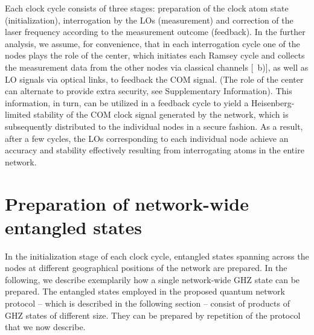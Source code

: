 Each clock cycle consists of three stages: preparation of the clock atom state
(initialization), interrogation by the LOs (measurement) and correction of the
laser frequency according to the measurement outcome (feedback).
In the further analysis, we assume, for convenience, that in each interrogation
cycle one of the nodes plays the role of the center, which initiates
each Ramsey cycle and collects the measurement data from the other nodes via
classical channels [~b)], as well as LO signals via optical links,
 to feedback the COM signal.
(The role of the center can alternate to provide extra security, see
 Supplementary Information). This information, in turn, can be utilized in a feedback cycle to yield a Heisenberg-limited
stability of the COM clock signal generated by the network, which is 
subsequently distributed to the individual nodes in a secure fashion.  As a
result, after a few cycles, the LOs corresponding to each individual node
achieve an accuracy and stability effectively resulting from interrogating atoms
in the entire network.



\section{Preparation of network-wide entangled states}
\label{sec:NWES}

In the initialization stage of each clock cycle, entangled states spanning
across the nodes at different geographical positions of the network are
prepared. In the following, we describe exemplarily how a single network-wide
GHZ state can be prepared. 
The entangled states employed in the proposed quantum network protocol -- which
is described in the following section -- consist of products of GHZ states of
different size. They can be prepared by repetition of the protocol that
we now describe.

